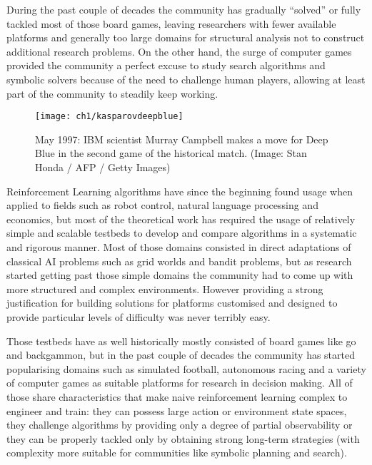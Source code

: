 During the past couple of decades the community has gradually ``solved'' or
fully tackled most of those board games, leaving researchers with fewer
available platforms and generally too large domains for structural analysis not
to construct additional research problems. On the other hand, the surge of
computer games provided the community a perfect excuse to study search
algorithms and symbolic solvers because of the need to challenge human players,
allowing at least part of the community to steadily keep working.

\begin{figure}[h]
    \centering
    \texttt{[image: ch1/kasparovdeepblue]}
    \caption{May 1997: IBM scientist Murray Campbell makes a move for Deep Blue
      in the second game of the historical match. (Image: Stan Honda / AFP /
      Getty Images)}
    \label{fig:kasparovdeepblue}
\end{figure}

Reinforcement Learning algorithms have since the beginning found usage when
applied to fields such as robot control, natural language processing and
economics, but most of the theoretical work has required the usage of relatively
simple and scalable testbeds to develop and compare algorithms in a systematic
and rigorous manner. Most of those domains consisted in direct adaptations of
classical AI problems such as grid worlds and bandit problems, but as research
started getting past those simple domains the community had to come up with more
structured and complex environments. However providing a strong justification
for building solutions for platforms customised and designed to provide
particular levels of difficulty was never terribly easy.

Those testbeds have as well historically mostly consisted of board games like go
and backgammon, but in the past couple of decades the community has started
popularising domains such as simulated football, autonomous racing and a variety
of computer games as suitable platforms for research in decision making. All of
those share characteristics that make naive reinforcement learning complex to
engineer and train: they can possess large action or environment state spaces,
they challenge algorithms by providing only a degree of partial observability or
they can be properly tackled only by obtaining strong long-term strategies (with
complexity more suitable for communities like symbolic planning and search).


